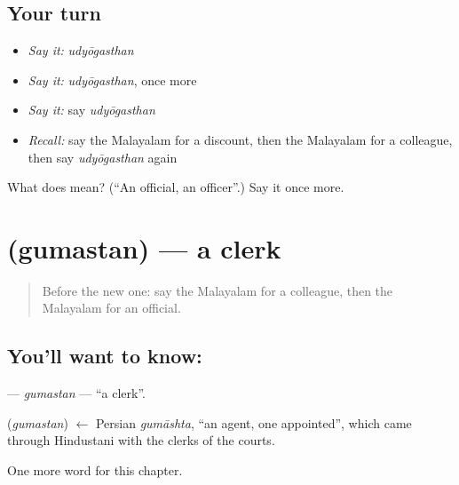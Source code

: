 \subsection*{Your turn}
\begin{itemize}
\raggedright
  \item \emph{Say it:} \emph{udyōgasthan}
  \item \emph{Say it:} \emph{udyōgasthan}, once more
  \item \emph{Say it:} say \emph{udyōgasthan}
  \item \emph{Recall:} say the Malayalam for a discount, then the Malayalam for a colleague, then say \emph{udyōgasthan} again
\end{itemize}

\begin{tcolorbox}[breakable,colback=teal!4,colframe=teal!35!black,title={Before you move on}]
What does  mean? (\textquotedblleft{}An official, an officer\textquotedblright{}.) Say it once more.
\end{tcolorbox}
\section[\texorpdfstring{\ml{ഗുമസ്തൻ} (gumastan)}{ഗുമസ്തൻ (gumastan)}]{ (gumastan) — a clerk}

\label{lesson:ML-C220-gumastan}



\begin{quote}
Before the new one: say the Malayalam for a colleague, then the Malayalam for an official.
\end{quote}

\subsection*{You'll want to know: }
\textbf{} — \emph{gumastan} — \textquotedblleft{}a clerk\textquotedblright{}.

\begin{cousinweb}
\textbf{} (\emph{gumastan}) $\leftarrow$ Persian \emph{gumāshta}, \textquotedblleft{}an agent, one appointed\textquotedblright{}, which came through Hindustani with the clerks of the courts.
\end{cousinweb}

\begin{grammarlens}[title={What you've built}]
One more word for this chapter.
\end{grammarlens}

